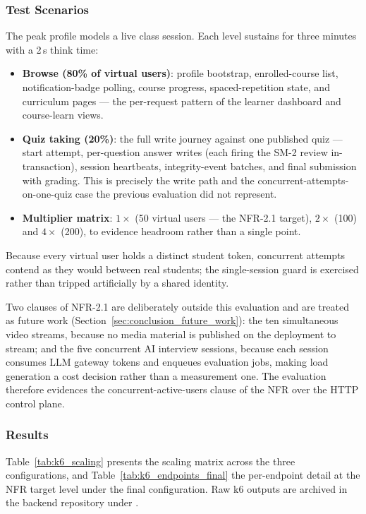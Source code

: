 \subsubsection{Test Scenarios}

The peak profile models a live class session. Each level sustains for three minutes with a 2\,s think time:

\begin{itemize}
    \item \textbf{Browse (80\% of virtual users)}: profile bootstrap, enrolled-course list, notification-badge polling, course progress, spaced-repetition state, and curriculum pages --- the per-request pattern of the learner dashboard and course-learn views.
    \item \textbf{Quiz taking (20\%)}: the full write journey against one published quiz --- start attempt, per-question answer writes (each firing the SM-2 review in-transaction), session heartbeats, integrity-event batches, and final submission with grading. This is precisely the write path and the concurrent-attempts-on-one-quiz case the previous evaluation did not represent.
    \item \textbf{Multiplier matrix}: $1\times$ (50 virtual users --- the NFR-2.1 target), $2\times$ (100) and $4\times$ (200), to evidence headroom rather than a single point.
\end{itemize}

Because every virtual user holds a distinct student token, concurrent attempts contend as they would between real students; the single-session guard is exercised rather than tripped artificially by a shared identity.

Two clauses of NFR-2.1 are deliberately outside this evaluation and are treated as future work (Section~\ref{sec:conclusion_future_work}): the ten simultaneous video streams, because no media material is published on the deployment to stream; and the five concurrent AI interview sessions, because each session consumes LLM gateway tokens and enqueues evaluation jobs, making load generation a cost decision rather than a measurement one. The evaluation therefore evidences the concurrent-active-users clause of the NFR over the HTTP control plane.

\subsubsection{Results}

Table~\ref{tab:k6_scaling} presents the scaling matrix across the three configurations, and Table~\ref{tab:k6_endpoints_final} the per-endpoint detail at the NFR target level under the final configuration. Raw k6 outputs are archived in the backend repository under .

